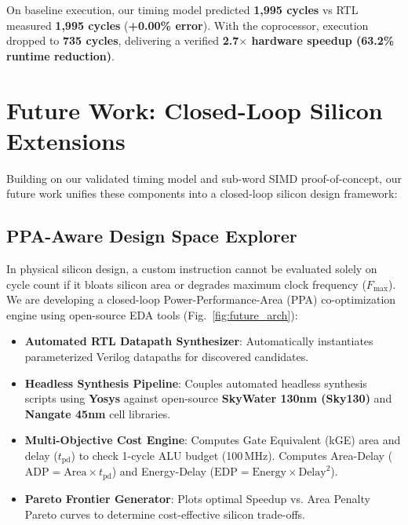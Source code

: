 \documentclass[conference]{IEEEtran}
\begin{document}
On baseline execution, our timing model predicted \textbf{1,995 cycles} vs RTL measured \textbf{1,995 cycles} (\textbf{+0.00\% error}). With the coprocessor, execution dropped to \textbf{735 cycles}, delivering a verified \textbf{2.7$\times$ hardware speedup (63.2\% runtime reduction)}.

\section{Future Work: Closed-Loop Silicon Extensions}

Building on our validated timing model and sub-word SIMD proof-of-concept, our future work unifies these components into a closed-loop silicon design framework:

\subsection{PPA-Aware Design Space Explorer}
In physical silicon design, a custom instruction cannot be evaluated solely on cycle count if it bloats silicon area or degrades maximum clock frequency ($F_{\text{max}}$). We are developing a closed-loop Power-Performance-Area (PPA) co-optimization engine using open-source EDA tools (Fig.~\ref{fig:future_arch}):
\begin{itemize}
    \item \textbf{Automated RTL Datapath Synthesizer}: Automatically instantiates parameterized Verilog datapaths for discovered candidates.
    \item \textbf{Headless Synthesis Pipeline}: Couples automated headless synthesis scripts using \textbf{Yosys} against open-source \textbf{SkyWater 130nm (Sky130)} and \textbf{Nangate 45nm} cell libraries.
    \item \textbf{Multi-Objective Cost Engine}: Computes Gate Equivalent (kGE) area and delay ($t_{\text{pd}}$) to check 1-cycle ALU budget (100\,MHz). Computes Area-Delay ($\text{ADP} = \text{Area} \times t_{\text{pd}}$) and Energy-Delay ($\text{EDP} = \text{Energy} \times \text{Delay}^2$).
    \item \textbf{Pareto Frontier Generator}: Plots optimal Speedup vs. Area Penalty Pareto curves to determine cost-effective silicon trade-offs.
\end{itemize}
\end{document}
